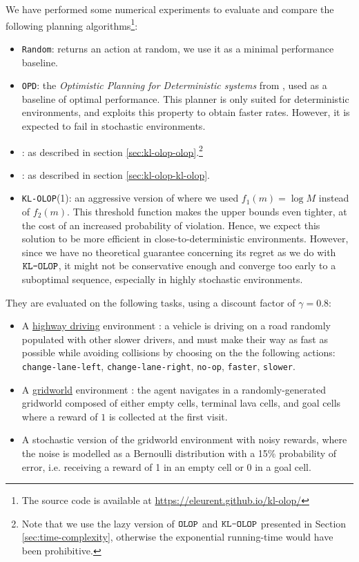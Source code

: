 \documentclass[runningheads, envcountsame, a4paper]{llncs}
\newcommand{\citep}{\cite}
\begin{document}
We have performed some numerical experiments to evaluate and compare the following planning algorithms\footnote[1]{The source code is available at \url{https://eleurent.github.io/kl-olop/}}:
\begin{itemize}
    \item \texttt{Random}: returns an action at random, we use it as a minimal performance baseline.
    \item \texttt{OPD}: the \emph{Optimistic Planning for Deterministic systems} from \citep{Hren2008}, used as a baseline of optimal performance. This planner is only suited for deterministic environments, and exploits this property to obtain faster rates. However, it is expected to fail in stochastic environments.
    \item \OLOP: as described in section \ref{sec:kl-olop-olop}.\footnote[2]{Note that we use the lazy version of $\texttt{OLOP}$ and $\texttt{KL-OLOP}$ presented in Section \ref{sec:time-complexity}, otherwise the exponential running-time would have been prohibitive.}
    \item \KLOLOP: as described in section \ref{sec:kl-olop-kl-olop}.\footnotemark[2]
    \item \texttt{KL-OLOP}(1): an aggressive version of \KLOLOP where we used $f_1(m) = \log M$ instead of $f_2(m)$. This threshold function makes the upper bounds even tighter, at the cost of an increased probability of violation. Hence, we expect this solution to be more efficient in close-to-deterministic environments. However, since we have no theoretical guarantee concerning its regret as we do with $\texttt{KL-OLOP}$, it might not be conservative enough and converge too early to a suboptimal sequence, especially in highly stochastic environments.
\end{itemize}

They are evaluated on the following tasks, using a discount factor of $\gamma=0.8$:
\begin{itemize}
    \item A \href{https://github.com/eleurent/highway-env/}{highway driving} environment \citep{highway-env}: a vehicle is driving on a road randomly populated with other slower drivers, and must make their way as fast as possible while avoiding collisions by choosing on the the following actions: \texttt{change-lane-left}, \texttt{change-lane-right}, \texttt{no-op}, \texttt{faster}, \texttt{slower}.
    \item A \href{https://github.com/maximecb/gym-minigrid}{gridworld} environment \citep{gym_minigrid}: the agent navigates in a randomly-generated gridworld composed of either empty cells, terminal lava cells, and goal cells where a reward of $1$ is collected at the first visit.
    \item A stochastic version of the gridworld environment with noisy rewards, where the noise is modelled as a Bernoulli distribution with a 15\% probability of error, i.e. receiving a reward of 1 in an empty cell or 0 in a goal cell.
\end{itemize}
\end{document}
